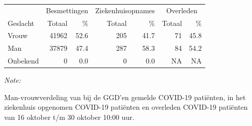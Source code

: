 \documentclass[
  english,
  man,floatsintext]{apa6}
\begin{document}
\begin{table}
\centering\begingroup\fontsize{11}{13}\selectfont

\begin{threeparttable}
\begin{tabular}{lrrrrrr}
\toprule
\multicolumn{1}{c}{ } & \multicolumn{2}{c}{Besmettingen} & \multicolumn{2}{c}{Ziekenhuisopnames} & \multicolumn{2}{c}{Overleden} \\
\cmidrule(l{3pt}r{3pt}){2-3} \cmidrule(l{3pt}r{3pt}){4-5} \cmidrule(l{3pt}r{3pt}){6-7}
Geslacht & Totaal & \% & Totaal & \% & Totaal & \%\\
\midrule
Vrouw & 41962 & 52.6 & 205 & 41.7 & 71 & 45.8\\
Man & 37879 & 47.4 & 287 & 58.3 & 84 & 54.2\\
Onbekend & 0 & 0.0 & 0 & 0.0 & NA & NA\\
\bottomrule
\end{tabular}
\begin{tablenotes}
\item \textit{Note: } 
\item Man-vrouwverdeling van bij de GGD’en gemelde COVID-19 patiënten, in het ziekenhuis opgenomen COVID-19 patiënten en overleden COVID-19 patiënten van 16 oktober t/m 30 oktober 10:00 uur.
\end{tablenotes}
\end{threeparttable}
\endgroup{}
\end{table}
\newpage
\end{document}
